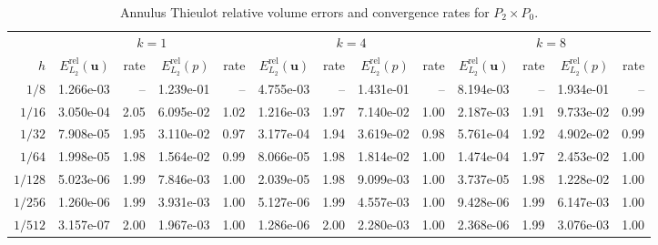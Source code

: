 \documentclass[10pt,a4paper]{article}
\begin{document}
\begin{table}[p]
\centering
\caption{Annulus Thieulot relative volume errors and convergence rates for $P_2\times P_0$.}
\label{tab:annulus_thieulot_v2_p0_disc}
\small
\begin{tabular}{
r rr rr rr rr rr rr
}
\toprule
& \multicolumn{4}{c}{$k=1$} & \multicolumn{4}{c}{$k=4$} & \multicolumn{4}{c}{$k=8$} \\
\cmidrule(lr){2-5}\cmidrule(lr){6-9}\cmidrule(lr){10-13}
$h$ & $E_{L_2}^{\mathrm{rel}}(\mathbf{u})$ & rate & $E_{L_2}^{\mathrm{rel}}(p)$ & rate & $E_{L_2}^{\mathrm{rel}}(\mathbf{u})$ & rate & $E_{L_2}^{\mathrm{rel}}(p)$ & rate & $E_{L_2}^{\mathrm{rel}}(\mathbf{u})$ & rate & $E_{L_2}^{\mathrm{rel}}(p)$ & rate \\
\midrule
$1/8$ & 1.266e-03 & -- & 1.239e-01 & -- & 4.755e-03 & -- & 1.431e-01 & -- & 8.194e-03 & -- & 1.934e-01 & -- \\
$1/16$ & 3.050e-04 & 2.05 & 6.095e-02 & 1.02 & 1.216e-03 & 1.97 & 7.140e-02 & 1.00 & 2.187e-03 & 1.91 & 9.733e-02 & 0.99 \\
$1/32$ & 7.908e-05 & 1.95 & 3.110e-02 & 0.97 & 3.177e-04 & 1.94 & 3.619e-02 & 0.98 & 5.761e-04 & 1.92 & 4.902e-02 & 0.99 \\
$1/64$ & 1.998e-05 & 1.98 & 1.564e-02 & 0.99 & 8.066e-05 & 1.98 & 1.814e-02 & 1.00 & 1.474e-04 & 1.97 & 2.453e-02 & 1.00 \\
$1/128$ & 5.023e-06 & 1.99 & 7.846e-03 & 1.00 & 2.039e-05 & 1.98 & 9.099e-03 & 1.00 & 3.737e-05 & 1.98 & 1.228e-02 & 1.00 \\
$1/256$ & 1.260e-06 & 1.99 & 3.931e-03 & 1.00 & 5.127e-06 & 1.99 & 4.557e-03 & 1.00 & 9.428e-06 & 1.99 & 6.147e-03 & 1.00 \\
$1/512$ & 3.157e-07 & 2.00 & 1.967e-03 & 1.00 & 1.286e-06 & 2.00 & 2.280e-03 & 1.00 & 2.368e-06 & 1.99 & 3.076e-03 & 1.00 \\
\bottomrule
\end{tabular}
\end{table}
\end{document}
